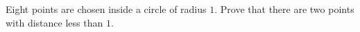 Eight points are chosen inside a circle of radius $1$. Prove that there are two points with distance less than $1$.
